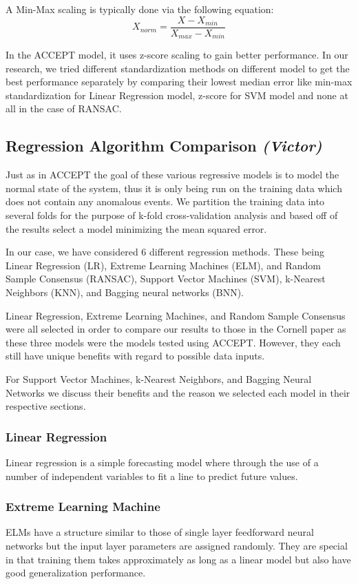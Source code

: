 \documentclass{acm_proc_article-sp}
\begin{document}
A Min-Max scaling is typically done via the following equation:
\begin{equation}X_{norm} = \frac{X - X_{min}}{X_{max}-X_{min}}\end{equation}

In the ACCEPT model, it uses z-score scaling to gain better performance. In our research, we tried different standardization methods on different model to get the best performance separately by comparing their lowest median error like min-max standardization for Linear Regression model, z-score for SVM model and none at all in the case of RANSAC. 

\subsection{Regression Algorithm Comparison \textit{(Victor)}}
Just as in ACCEPT the goal of these various regressive models is to model the normal state of the system, thus it is only being run on the training data which does not contain any anomalous events. We partition the training data into several folds for the purpose of k-fold cross-validation analysis and based off of the results select a model minimizing the mean squared error.

In our case, we have considered 6 different regression methods. These being Linear Regression (LR), Extreme Learning Machines (ELM), and Random Sample Consensus (RANSAC), Support Vector Machines (SVM), k-Nearest Neighbors (KNN), and Bagging neural networks (BNN).

Linear Regression, Extreme Learning Machines, and Random Sample Consensus were all selected in order to compare our results to those in the Cornell paper as these three models were the models tested using ACCEPT. However, they each still have unique benefits with regard to possible data inputs.

For Support Vector Machines, k-Nearest Neighbors, and Bagging Neural Networks we discuss their benefits and the reason we selected each model in their respective sections.

\subsubsection{Linear Regression}
Linear regression is a simple forecasting model where through the use of a number of independent variables to fit a line to predict future values\cite{Cornell}.

\subsubsection{Extreme Learning Machine}
ELMs have a structure similar to those of single layer feedforward neural networks but the input layer parameters are assigned randomly. They are special in that training them takes approximately as long as a linear model but also have good generalization performance\cite{Cornell}.
\end{document}
